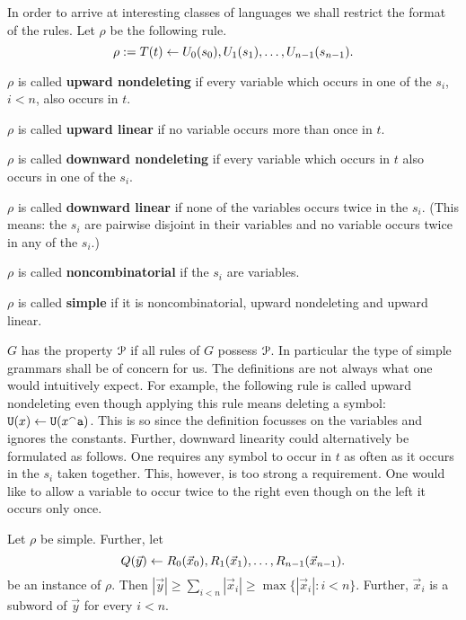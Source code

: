 In order to arrive at interesting classes of languages we shall
restrict the format of the rules. Let $\rho$ be the following rule.
\begin{equation}
\rho := T(t) \leftarrow U_0(s_0),U_1(s_1),\dotsc, U_{n-1}(s_{n-1}).
\end{equation}
\begin{dinglist}{43}
\item $\rho$ is called \textbf{upward nondeleting} if
    every variable which occurs in one of the $s_i$, $i < n$,
    also occurs in $t$.
\item $\rho$ is called \textbf{upward linear} if no variable
    occurs more than once in $t$.
\item $\rho$ is called \textbf{downward nondeleting} if every
    variable which occurs in $t$ also occurs in one of
    the $s_i$.
\item $\rho$ is called \textbf{downward linear} if none of the
    variables occurs twice in the $s_i$. (This means:
    the $s_i$ are pairwise disjoint in their variables
    and no variable occurs twice in any of the $s_i$.)
\item $\rho$ is called \textbf{noncombinatorial} if the
    $s_i$ are variables.
\item $\rho$ is called \textbf{simple} if it is noncombinatorial,
    upward nondeleting and upward linear.
\end{dinglist}
$G$ has the property $\mathcal{P}$ if all rules of $G$ possess
$\mathcal{P}$. In particular the type of simple grammars shall
be of concern for us. The definitions are not always
what one would intuitively expect. For example, the following
rule is called upward nondeleting even though applying this
rule means deleting a symbol:
$\mbox{\tt U}(x) \leftarrow \mbox{\tt U}(x {^{\smallfrown}} \mbox{\tt a})$.
This is so since the definition focusses on the variables
and ignores the constants. Further, downward linearity could
alternatively be formulated as follows. One requires any
symbol to occur in $t$ as often as it occurs in the
$s_i$ taken together. This, however, is too strong a 
requirement. One would like to allow a variable to occur 
twice to the right even though on the left it occurs only once.
\begin{lem}
\label{lem:einf}
Let $\rho$ be simple. Further, let 
\begin{equation}
Q(\vec{y}) \leftarrow R_0(\vec{x}_0),R_1(\vec{x}_1),
\dotsc, R_{n-1}(\vec{x}_{n-1}).
\end{equation}
be an instance of $\rho$. Then $|\vec{y}| \geq \sum_{i < n} 
|\vec{x}_i| \geq \max \{|\vec{x}_i| : i < n\}$. Further, $\vec{x}_i$ 
is a subword of $\vec{y}$ for every $i < n$.
\end{lem}

